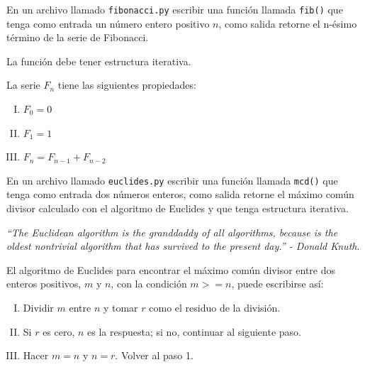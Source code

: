 \documentclass[11pt,letterpaper]{exam}
\begin{document}
\begin{questions}

 En un archivo llamado \verb"fibonacci.py" 
escribir una función llamada \verb"fib()" que tenga como entrada un número entero 
positivo $n$, como salida retorne el n-\'esimo t\'ermino de la serie de Fibonacci.

La función debe tener estructura iterativa.

\medskip
La serie $F_n$ tiene las siguientes propiedades:
\begin{enumerate}[I.)]
	\item $F_0 = 0$
	\item $F_1 = 1$
	\item $F_n = F_{n-1} +F_{n-2}$
\end{enumerate}

En un archivo llamado \verb"euclides.py"  escribir una función llamada \verb"mcd()"
que tenga como entrada dos números enteros, como salida retorne el máximo común divisor
calculado con el algoritmo de Euclides y que tenga estructura iterativa.

\medskip
\textit{``The Euclidean algorithm is the granddaddy of all algorithms, because is
the oldest nontrivial algorithm that has survived to the present day.'' - Donald
Knuth}.
\medskip

El algoritmo de Euclides para encontrar el máximo común divisor entre dos 
enteros positivos, $m$ y $n$, con la condición $m>=n$, puede escribirse así:

\begin{enumerate}[I.)]
	\item Dividir $m$ entre $n$ y tomar $r$ como el residuo de la división.

	\item Si $r$ es cero, $n$ es la respuesta; si no, continuar al siguiente paso.

	\item Hacer $m=n$ y $n=r$. Volver al paso 1.
\end{enumerate}

\end{questions}
\end{document}
